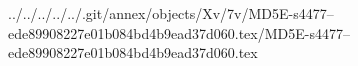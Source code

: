 ../../../../../.git/annex/objects/Xv/7v/MD5E-s4477--ede89908227e01b084bd4b9ead37d060.tex/MD5E-s4477--ede89908227e01b084bd4b9ead37d060.tex